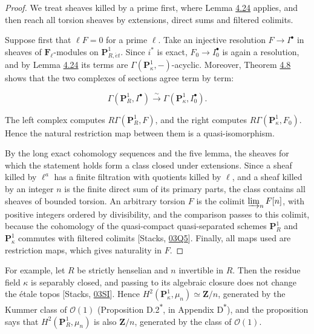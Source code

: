 \documentclass[11pt]{article}
\newcommand{\bpout}[1]{#1\textsuperscript{\hyperlink{bp-outside}{\ensuremath{\ast}}}}
\begin{document}
\begin{proof}[{Proof}]\label{bp356}%
We treat sheaves killed by a prime first, where Lemma \hyperref[bp352]{4.24} applies, and then reach all torsion sheaves by extensions, direct sums and filtered colimits.

Suppose first that \(\ell F=0\) for a prime \(\ell\).  Take an injective resolution \(F\to I^\bullet\) in sheaves of \(\mathbf F_\ell\)-modules on \(\mathbf P^1_{R,\acute{e}t}\). Since \(i^*\) is exact, \(F_0\to I_0^\bullet\) is again a resolution, and by Lemma \hyperref[bp352]{4.24} its terms are \(\Gamma(\mathbf P^1_\kappa,-)\)-acyclic. Moreover, Theorem \hyperref[bp308]{4.8} shows that the two complexes of sections agree term by term:

\[
\Gamma(\mathbf P^1_R,I^\bullet)\xrightarrow{\sim}
\Gamma(\mathbf P^1_\kappa,I_0^\bullet).
\]

The left complex computes \(R\Gamma(\mathbf P^1_R,F)\), and the right computes \(R\Gamma(\mathbf P^1_\kappa,F_0)\). Hence the natural restriction map between them is a quasi-isomorphism.

By the long exact cohomology sequences and the five lemma, the sheaves for which the statement holds form a class closed under extensions. Since a sheaf killed by \(\ell^a\) has a finite filtration with quotients killed by \(\ell\), and a sheaf killed by an integer \(n\) is the finite direct sum of its primary parts, the class contains all sheaves of bounded torsion. An arbitrary torsion \(F\) is the colimit \(\varinjlim_n F[n]\), with positive integers ordered by divisibility, and the comparison passes to this colimit, because the cohomology of the quasi-compact quasi-separated schemes \(\mathbf P^1_R\) and \(\mathbf P^1_\kappa\) commutes with filtered colimits [Stacks, \href{https://stacks.math.columbia.edu/tag/03Q5}{03Q5}]. Finally, all maps used are restriction maps, which gives naturality in \(F\).
\end{proof}

\label{bp357}%
For example, let \(R\) be strictly henselian and \(n\) invertible in \(R\). Then the residue field \(\kappa\) is separably closed, and passing to its algebraic closure does not change the étale topos [Stacks, \href{https://stacks.math.columbia.edu/tag/03SI}{03SI}]. Hence \(H^2(\mathbf P^1_\kappa,\mu_n)\simeq\mathbf Z/n\), generated by the Kummer class of \(\mathcal O(1)\) (Proposition \bpout{D.2}, in Appendix \bpout{D}), and the proposition says that \(H^2(\mathbf P^1_R,\mu_n)\) is also \(\mathbf Z/n\), generated by the class of \(\mathcal O(1)\).
\end{document}
